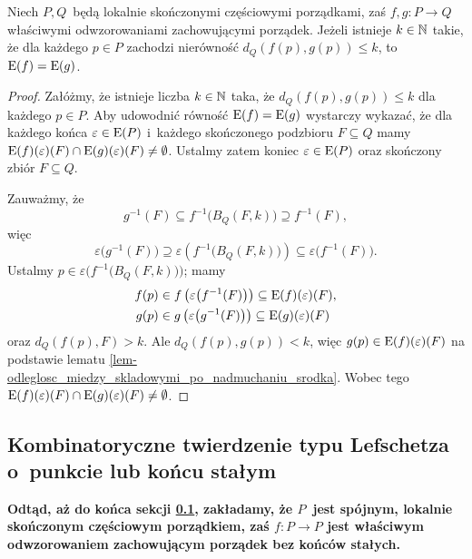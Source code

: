 \begin{lem}\label{lem-bliskie_funkcje_to_samo_na_koncach}
Niech $P,Q$~będą lokalnie skończonymi częściowymi porządkami, zaś $f,g\colon P\to Q$ właściwymi odwzorowaniami zachowującymi porządek. Jeżeli istnieje $k\in\mathbb{N}$ takie, że dla każdego $p\in P$ zachodzi nierówność $d_Q(f(p),g(p))\leq k$, to $\mathrm{E}(f)=\mathrm{E}(g)$.
\end{lem}
\begin{proof}
Załóżmy, że istnieje liczba $k\in \mathbb{N}$ taka, że $d_Q(f(p),g(p))\leq k$ dla każdego $p\in P$. Aby udowodnić równość $\mathrm{E}(f)=\mathrm{E}(g)$ wystarczy wykazać, że dla każdego końca $\varepsilon\in \mathrm{E}(P)$ i~każdego skończonego podzbioru $F\subseteq Q$ mamy 
\mbox{$\mathrm{E}(f)(\varepsilon)(F)\cap \mathrm{E}(g)(\varepsilon)(F)\not=\emptyset$}. Ustalmy zatem koniec $\varepsilon\in \mathrm{E}(P)$ oraz skończony zbiór $F\subseteq Q$. 

Zauważmy, że \[g^{-1}(F)\subseteq f^{-1}\big(B_Q(F,k)\big)\supseteq f^{-1}(F),\] więc \[\varepsilon\big(g^{-1}(F)\big)\supseteq \varepsilon\left(f^{-1}\big(B_Q(F,k)\big)\right)\subseteq \varepsilon\big(f^{-1}(F)\big).\]
Ustalmy $p\in \varepsilon\bigl(f^{-1}\big(B_Q(F,k)\big)\bigr)$; mamy \begin{align*}f(p)&\in f\left( \varepsilon\big(f^{-1}(F)\big)\right)\subseteq \mathrm{E}(f)(\varepsilon)(F),\\ g(p)&\in  g\left(\varepsilon\big(g^{-1}(F)\big)\right)\subseteq \mathrm{E}(g)(\varepsilon)(F)\end{align*} oraz $d_Q(f(p),F)>k$. Ale $d_Q(f(p),g(p))<k$, więc $g(p)\in \mathrm{E}(f)(\varepsilon)(F)$ na podstawie lematu \ref{lem-odleglosc_miedzy_skladowymi_po_nadmuchaniu_srodka}. Wobec tego $\mathrm{E}(f)(\varepsilon)(F)\cap \mathrm{E}(g)(\varepsilon)(F)\not=\emptyset$.
\end{proof}






\subsection{Kombinatoryczne twierdzenie typu Lefschetza o~punkcie lub końcu stałym}\label{subsec-komb_twi_lefschetza}
\textbf{Odtąd, aż do końca sekcji \ref{subsec-komb_twi_lefschetza}, zakładamy, że $P$~jest spójnym, lokalnie skończonym częściowym porządkiem, zaś $f\colon P\to P$ jest właściwym odwzorowaniem zachowującym porządek bez końców stałych.}

